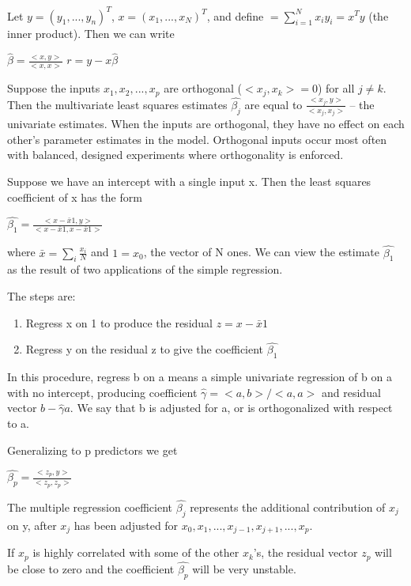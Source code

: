 \documentclass[11pt]{article}
\begin{document}
Let \(y = (y_1, ..., y_n)^T\), \(x = (x_1, ..., x_N)^T\), and define
\(<x, y> = \sum_{i=1}^N x_i y_i = x^Ty\) (the inner product). Then we can write 

\(\hat{\beta} = \frac{<x, y>}{<x, x>}\)
\(r = y - x\hat{\beta}\)

Suppose the inputs \(x_1, x_2, ..., x_p\) are orthogonal (\(<x_j, x_k> = 0\)) for all \(j \neq k\). Then the multivariate least squares estimates \(\hat{\beta_j}\) are equal to \(\frac{<x_j, y>}{<x_j, x_j>}\) -- the univariate estimates. When the inputs are orthogonal, they have no effect on each other's parameter estimates in the model. Orthogonal inputs occur most often with balanced, designed experiments where orthogonality is enforced. 

Suppose we have an intercept with a single input x. Then the least squares coefficient of x has the form

\(\hat{\beta_1} = \frac{<x - \bar{x}1, y>}{<x - \bar{x}1, x - \bar{x}1>}\)

where \(\bar{x} = \sum_i \frac{x_i}{N}\) and \(1 = x_0\), the vector of N ones. We can view the estimate \(\hat{\beta_1}\) as the result of two applications of the simple regression. 

The steps are:

\begin{enumerate}
\item Regress x on 1 to produce the residual \(z = x - \bar{x}1\)
\item Regress y on the residual z to give the coefficient \(\hat{\beta_1}\)
\end{enumerate}

In this procedure, regress b on a means a simple univariate regression of b on a with no intercept, producing coefficient \(\hat{\gamma} = <a, b>/<a, a>\) and residual vector \(b - \hat{\gamma}a\). We say that b is adjusted for a, or is orthogonalized with respect to a. 

Generalizing to p predictors we get 

\(\hat{\beta_p} = \frac{<z_p, y>}{<z_p, z_p>}\)

The multiple regression coefficient \(\hat{\beta_j}\) represents the additional contribution of \(x_j\) on y, after \(x_j\) has been adjusted for \(x_0, x_1, ..., x_{j-1}, x_{j+1}, ..., x_p\).

If \(x_p\) is highly correlated with some of the other \(x_k\)'s, the residual vector \(z_p\) will be close to zero and the coefficient \(\hat{\beta_p}\) will be very unstable. 
\end{document}
